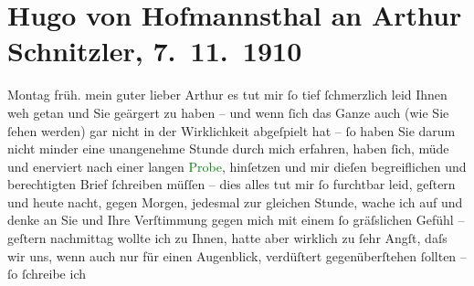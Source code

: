

               \section[Hugo von Hofmannsthal an Arthur Schnitzler, 7. 11. 1910]{ Hugo von Hofmannsthal an Arthur Schnitzler, 7. 11. 1910}\nopagebreak{}\rehead{ }\normalsize\beginnumbering{} \toendnotes[C]{\smallbreak\pagebreak[2]} 
\toendnotes[C]{\smallbreak}\pstart
           \raggedleft{}{\pb}Montag{ }früh.\pend
           \pstart{}mein guter lieber Arthur \pend\pstart
           es tut mir ſo tief ſchmerzlich leid Ihnen weh getan und Sie geärgert zu haben – und
               wenn ſich das Ganze auch (wie Sie ſehen werden) gar nicht in der Wirklichkeit
               abgeſpielt hat – ſo haben Sie darum nicht minder eine unangenehme Stunde durch mich
               erfahren, haben ſich, {\pb}müde und
               enerviert nach einer langen \textcolor{green}{Probe}{}\ledrightnote{\textcolor{green}{Der junge Medardus. Dramatische Historie in einem Vorspiel und fünf Aufzügen}}, hinſetzen und
               mir dieſen begreiflichen und berechtigten Brief ſchreiben müſſen – dies alles tut mir
               ſo furchtbar leid, geſtern und heute nacht, gegen Morgen, jedesmal zur gleichen
               Stunde, wache ich auf und denke an Sie und Ihre Verſtimmung gegen mich mit einem ſo
                  {\pb}gräſslichen Gefühl – geſtern
               nachmittag wollte ich zu Ihnen, hatte aber wirklich zu ſehr Angſt, daſs wir uns, wenn
               auch nur für einen Augenblick, verdüſtert gegenüberſtehen ſollten – ſo ſchreibe ich
